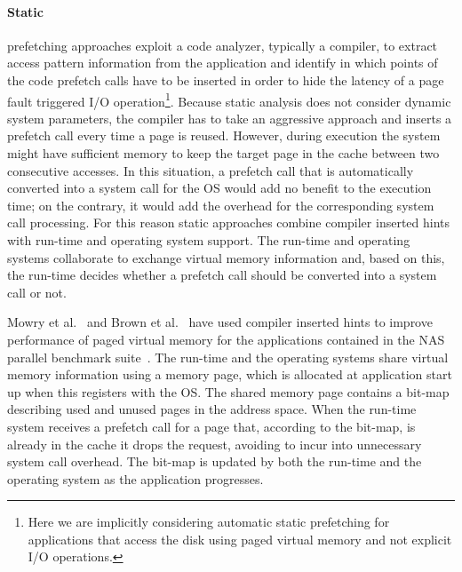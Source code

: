 \paragraph{Static} prefetching approaches exploit a code analyzer, typically a compiler, to extract access pattern information from the application and identify in which points of the code prefetch calls have to be inserted in order to hide the
latency of a page fault triggered I/O operation\footnote{Here we are implicitly considering automatic static prefetching for applications that access the disk using paged virtual memory and not explicit I/O operations.}. Because static
analysis does not consider dynamic system parameters, the compiler has to take an aggressive approach and inserts a prefetch call every time a page is reused. However, during execution the system might have sufficient memory to keep
the target page in the cache between two consecutive accesses. In this situation, a prefetch call that is automatically converted into a system call for the OS would add no benefit to the execution time; on the contrary, it would add
the overhead for the corresponding system call processing. For this reason static approaches combine compiler inserted hints with run-time and operating system support. The run-time and operating systems collaborate to exchange virtual
memory information and, based on this, the run-time decides whether a prefetch call should be converted into a system call or not. 

Mowry et al.~\cite{Mowry1996} and Brown et al.~\cite{Brown2001} have used compiler inserted hints to improve performance of paged virtual memory for the applications contained in the NAS parallel benchmark suite~\cite{Bailey1991}. 
The run-time and the operating systems share virtual memory information using a memory page, which is allocated at application start up when this registers with the OS. The shared memory page contains a bit-map describing used and 
unused pages in the address space. When the run-time system receives a prefetch call for a page that, according to the bit-map, is already in the cache it drops the request, avoiding to incur into unnecessary system call overhead. 
The bit-map is updated by both the run-time and the operating system as the application progresses.

